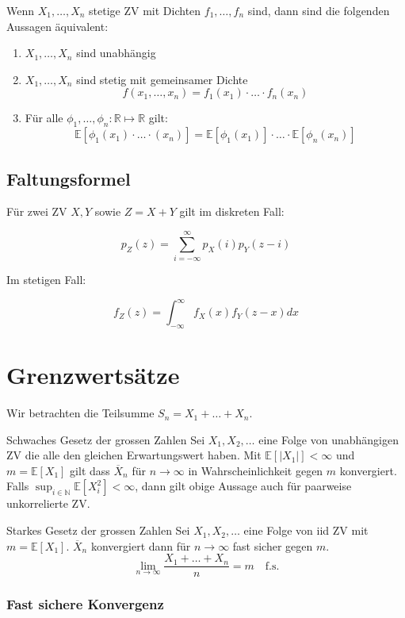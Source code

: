 \documentclass[a4paper,10pt]{article}
\def\R{\mathbb{R}}
\def\E{\mathbb{E}}
\begin{document}
Wenn \(X_1, \ldots, X_n\) stetige ZV mit Dichten \(f_1, \ldots, f_n\) sind, dann sind die folgenden Aussagen äquivalent:
\begin{enumerate}
	\item \(X_1, \ldots, X_n\) sind unabhängig
	\item \(X_1, \ldots, X_n\) sind stetig mit gemeinsamer Dichte
	      \[f(x_1, \ldots, x_n) = f_1(x_1) \cdot \ldots \cdot f_n(x_n)\]
	\item Für alle \(\phi_1, \ldots, \phi_n: \R \mapsto \R\) gilt:
	      \[\E[\phi_1 (x_1)\cdot \ldots\cdot (x_n)] = \E[\phi_1(x_1)] \cdot \ldots \cdot \E[\phi_n(x_n)]\]
\end{enumerate}

\subsection{Faltungsformel}

Für zwei ZV $X, Y$ sowie $Z = X + Y$ gilt im diskreten Fall:

$$
	p_Z(z) = \sum_{i = -\infty}^\infty p_X(i) p_Y(z - i)
$$

Im stetigen Fall:

$$
	f_Z(z) = \int_{-\infty}^\infty f_X(x) f_Y(z - x) dx
$$

\section{Grenzwertsätze}
 Wir betrachten die Teilsumme \(S_n = X_1 + \ldots + X_n\).
\begin{mainbox}{Schwaches Gesetz der grossen Zahlen}
	Sei \(X_1, X_2, \ldots\) eine Folge von unabhängigen ZV die alle den gleichen Erwartungswert haben. Mit \(\E[|X_1|] < \infty\) und \(m = \E[X_1]\) gilt dass $\overline{X}_n$ für $n \to \infty$ in Wahrscheinlichkeit gegen $m$ konvergiert. Falls $\sup_{i \in \mathbb{N}} \E[X_i^2] < \infty$, dann gilt obige Aussage auch für paarweise unkorrelierte ZV.
\end{mainbox}

\begin{mainbox}{Starkes Gesetz der grossen Zahlen}
	Sei $X_1, X_2, \ldots$ eine Folge von iid ZV mit $m = \E[X_1]$. $\overline{X}_n$ konvergiert dann für $n \to \infty$ fast sicher gegen $m$.
	$$
	\lim_{n\to \infty} \frac{X_1 + \ldots + X_n}{n} = m \quad \text{f.s.}
	$$
\end{mainbox}

\subsubsection*{Fast sichere Konvergenz}
\end{document}
